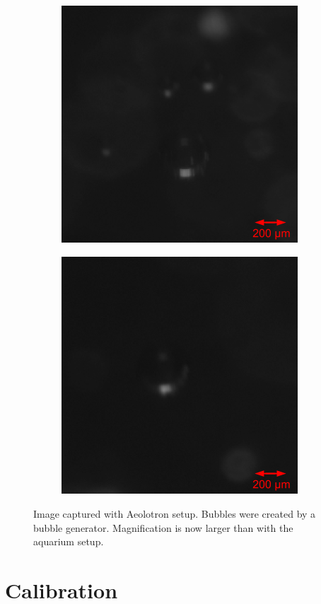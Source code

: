 			\begin{figure}
				\begin{subfigure}[t]{.55\textwidth}
				\centering
				\includegraphics[scale=0.5]{images/aeolotron_result_small_1.png}
				\caption{}
				\label{subfig:aquarium_result_sat}
			\end{subfigure}\hfill
			\begin{subfigure}[t]{.55\textwidth}
				\centering
				\includegraphics[scale=0.5]{images/aeolotron_result_small_2.png}
				\caption{}
			\end{subfigure}
				\caption{Image captured with Aeolotron setup. Bubbles were created by a bubble generator. Magnification is now larger than with the aquarium setup.}
								
				\label{fig:aeolotron_result}
			\end{figure}
	
	
	\section{Calibration}\label{calibration_setup}
